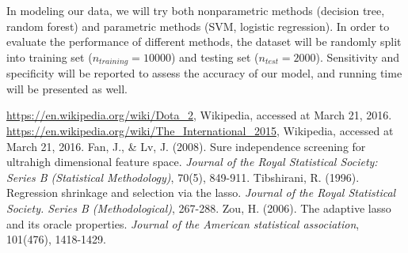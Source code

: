 \documentclass[11pt]{article}
\begin{document}
\noindent In modeling our data, we will try both nonparametric methods (decision tree, random forest) and parametric methods (SVM, logistic regression). In order to evaluate the performance of different methods, the dataset will be randomly split into training set ($n_{training} = 10000$) and testing set ($n_{test} = 2000$). Sensitivity and specificity will be reported to assess the accuracy of our model, and running time will be presented as well. 
\begin{thebibliography}{9}
	 \url{https://en.wikipedia.org/wiki/Dota_2}, Wikipedia, accessed at March 21, 2016.
	 \url{https://en.wikipedia.org/wiki/The_International_2015}, Wikipedia, accessed at March 21, 2016.
	 Fan, J., \& Lv, J. (2008). Sure independence screening for ultrahigh dimensional feature space. \emph{Journal of the Royal Statistical Society: Series B (Statistical Methodology)}, 70(5), 849-911.
	 Tibshirani, R. (1996). Regression shrinkage and selection via the lasso. \emph{Journal of the Royal Statistical Society. Series B (Methodological)}, 267-288.
	 Zou, H. (2006). The adaptive lasso and its oracle properties. \emph{Journal of the American statistical association}, 101(476), 1418-1429.
\end{thebibliography}
\end{document}
